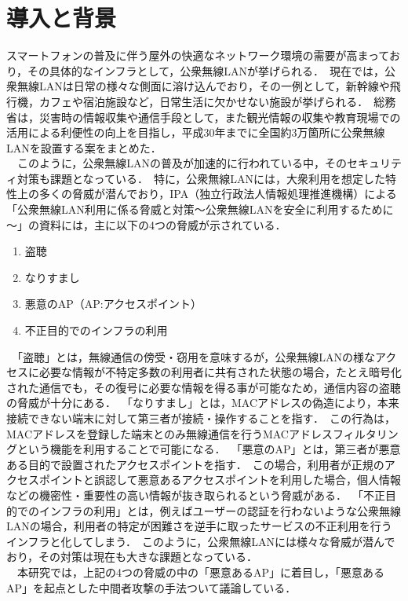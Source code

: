 \documentclass[dvipdfmx,twocolumn,9pt]{jsarticle}
\begin{document}
    \section{導入と背景}
        スマートフォンの普及に伴う屋外の快適なネットワーク環境の需要が高まっており，その具体的なインフラとして，公衆無線LANが挙げられる．\
        現在では，公衆無線LANは日常の様々な側面に溶け込んでおり，その一例として，新幹線や飛行機，カフェや宿泊施設など，日常生活に欠かせない施設が挙げられる．\
        総務省は，災害時の情報収集や通信手段として，また観光情報の収集や教育現場での活用による利便性の向上を目指し，平成30年までに全国約3万箇所に公衆無線LANを設置する案をまとめた\cite{SoumuWiFi}．\\
        　このように，公衆無線LANの普及が加速的に行われている中，そのセキュリティ対策も課題となっている．\
        特に，公衆無線LANには，大衆利用を想定した特性上の多くの脅威が潜んでおり，IPA（独立行政法人情報処理推進機構）による「公衆無線LAN利用に係る脅威と対策～公衆無線LANを安全に利用するために～」の資料\cite{IPA}には，主に以下の4つの脅威が示されている．\
        \begin{enumerate}
            \item 盗聴
            \item なりすまし
            \item 悪意のAP（AP:アクセスポイント）
            \item 不正目的でのインフラの利用
        \end{enumerate}
        　「盗聴」とは，無線通信の傍受・窃用を意味するが，公衆無線LANの様なアクセスに必要な情報が不特定多数の利用者に共有された状態の場合，たとえ暗号化された通信でも，その復号に必要な情報を得る事が可能なため，通信内容の盗聴の脅威が十分にある．\
        「なりすまし」とは，MACアドレスの偽造により，本来接続できない端末に対して第三者が接続・操作することを指す．\
        この行為は，MACアドレスを登録した端末とのみ無線通信を行うMACアドレスフィルタリングという機能を利用することで可能になる．\
        「悪意のAP」とは，第三者が悪意ある目的で設置されたアクセスポイントを指す．\
        この場合，利用者が正規のアクセスポイントと誤認して悪意あるアクセスポイントを利用した場合，個人情報などの機密性・重要性の高い情報が抜き取られるという脅威がある．\
        「不正目的でのインフラの利用」とは，例えばユーザーの認証を行わないような公衆無線LANの場合，利用者の特定が困難さを逆手に取ったサービスの不正利用を行うインフラと化してしまう．\
        このように，公衆無線LANには様々な脅威が潜んでおり，その対策は現在も大きな課題となっている．\\
        　本研究では，上記の4つの脅威の中の「悪意あるAP」に着目し，「悪意あるAP」を起点とした中間者攻撃の手法ついて議論している．\
\end{document}
